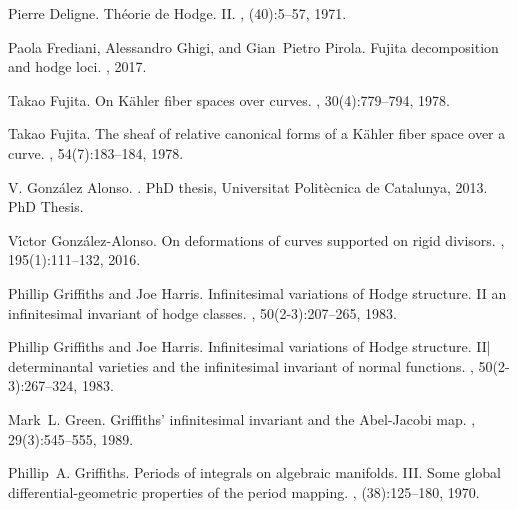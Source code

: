 \documentclass[a4paper,11pt]{amsart}
\begin{document}
{\begin{thebibliography}{CEZGT14}
		Pierre Deligne.
		\newblock Th\'eorie de {H}odge. {II}.
		, (40):5--57, 1971.
		
		Paola Frediani, Alessandro Ghigi, and Gian~Pietro Pirola.
		\newblock Fujita decomposition and hodge loci.
		, 2017.
		
		Takao Fujita.
		\newblock On {K}\"ahler fiber spaces over curves.
		, 30(4):779--794, 1978.
		
		Takao Fujita.
		\newblock The sheaf of relative canonical forms of a {K}\"ahler fiber space
		over a curve.
		, 54(7):183--184, 1978.
		
		{V}. {G}onz{\'a}lez {A}lonso.
		.
		\newblock PhD thesis, Universitat Polit{\`e}cnica de Catalunya, 2013.
		\newblock PhD Thesis.
		
		V{\'{\i}}ctor Gonz{\'a}lez-Alonso.
		\newblock On deformations of curves supported on rigid divisors.
		, 195(1):111--132, 2016.
		
		Phillip Griffiths and Joe Harris.
		\newblock Infinitesimal variations of {H}odge structure. {II} an infinitesimal
		invariant of hodge classes.
		, 50(2-3):207--265, 1983.
		
		Phillip Griffiths and Joe Harris.
		\newblock Infinitesimal variations of {H}odge structure. {II|} determinantal
		varieties and the infinitesimal invariant of normal functions.
		, 50(2-3):267--324, 1983.
		
		Mark~L. Green.
		\newblock Griffiths' infinitesimal invariant and the {A}bel-{J}acobi map.
		, 29(3):545--555, 1989.
		
		Phillip~A. Griffiths.
		\newblock Periods of integrals on algebraic manifolds. {III}. {S}ome global
		differential-geometric properties of the period mapping.
		, (38):125--180, 1970.
		

\end{thebibliography}}
\end{document}
